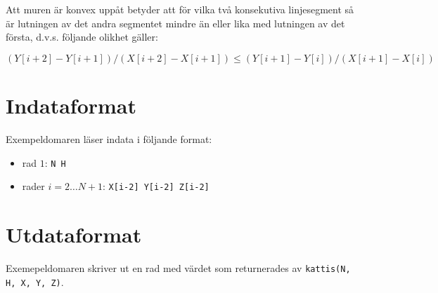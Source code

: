 Att muren är konvex uppåt betyder att för vilka två konsekutiva linjesegment så är lutningen av det andra segmentet mindre än eller lika med lutningen av det första, d.v.s. följande olikhet gäller:

$$(Y[i+2] - Y[i+1]) / (X[i+2] - X[i+1]) \le (Y[i+1] - Y[i]) / (X[i+1] - X[i])$$

\section*{Indataformat}
Exempeldomaren läser indata i följande format:

\begin{itemize}
  \item rad $1$: \texttt{N H}
  \item rader $i = 2 \dots N+1$: \texttt{X[i-2] Y[i-2] Z[i-2]}
\end{itemize}

\section*{Utdataformat}
Exemepeldomaren skriver ut en rad med värdet som returnerades av \texttt{kattis(N, H, X, Y, Z)}.
